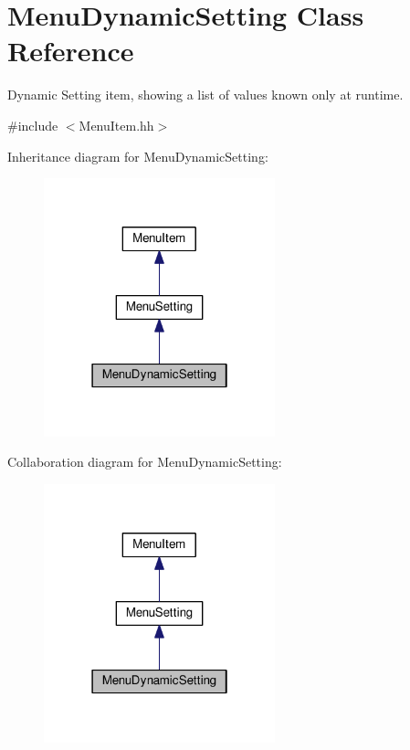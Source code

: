 \hypertarget{classMenuDynamicSetting}{}\section{Menu\+Dynamic\+Setting Class Reference}
\label{classMenuDynamicSetting}


Dynamic Setting item, showing a list of values known only at runtime.  




{\ttfamily \#include $<$Menu\+Item.\+hh$>$}



Inheritance diagram for Menu\+Dynamic\+Setting\+:
\nopagebreak
\begin{figure}[H]
\begin{center}
\leavevmode
\includegraphics[width=190pt]{classMenuDynamicSetting__inherit__graph}
\end{center}
\end{figure}


Collaboration diagram for Menu\+Dynamic\+Setting\+:
\nopagebreak
\begin{figure}[H]
\begin{center}
\leavevmode
\includegraphics[width=190pt]{classMenuDynamicSetting__coll__graph}
\end{center}
\end{figure}
